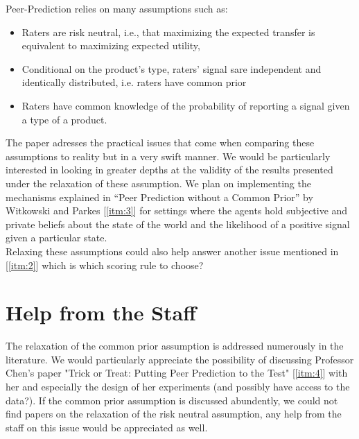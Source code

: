 \documentclass{scrartcl}
\begin{document}
Peer-Prediction relies on many assumptions such as:
\begin{itemize}
\item Raters are risk neutral, i.e., that maximizing the expected transfer is equivalent to maximizing expected utility,
\item Conditional on the product’s type, raters’ signal sare independent and identically distributed, i.e. raters have common prior
\item Raters have common knowledge of the probability of reporting a signal given a type of a product.
\end{itemize}
The paper adresses the practical issues that come when comparing these assumptions to reality but in a very swift manner. We would be particularly interested in looking in greater depths at the validity of the results presented under the relaxation of these assumption. We plan on implementing the mechanisms explained in ``Peer Prediction without a Common Prior'' by Witkowski and Parkes [\ref{itm:3}] for settings where the agents hold subjective and private beliefs about the state of the world and the likelihood of a positive signal given a particular state.\\

Relaxing these assumptions could also help answer another issue mentioned in [\ref{itm:2}] which is which scoring rule to choose? 

\section{Help from the Staff}

The relaxation of the common prior assumption is addressed numerously in the literature. We would particularly appreciate the possibility of discussing Professor Chen's paper "Trick or Treat: Putting Peer Prediction to the Test" [\ref{itm:4}] with her and especially the design of her experiments (and possibly have access to the data?). If the common prior assumption is discussed abundently, we could not find papers on the relaxation of the risk neutral assumption, any help from the staff on this issue would be appreciated as well.
\end{document}
